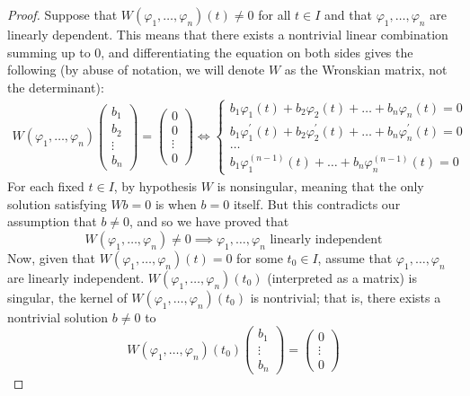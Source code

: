 \documentclass{article}
\theoremstyle{remark}
\theoremstyle{definition}
\begin{document}
\begin{proof}
Suppose that $W(\varphi_1, \ldots, \varphi_n) (t) \neq 0$ for all $t \in I$ and that $\varphi_1, \ldots, \varphi_n$ are linearly dependent. This means that there exists a nontrivial linear combination summing up to $0$, and differentiating the equation on both sides gives the following (by abuse of notation, we will denote $W$ as the Wronskian matrix, not the determinant): 
\begin{align*}
    W(\varphi_1, \ldots, \varphi_n) \begin{pmatrix}
    b_1 \\ b_2 \\ \vdots \\ b_n \end{pmatrix} = \begin{pmatrix}
    0 \\ 0 \\ \vdots \\ 0 \end{pmatrix} \iff
    \begin{cases}
    b_1 \varphi_1 (t) + b_2 \varphi_2 (t) + \ldots + b_n \varphi_n (t) = 0 \\
    b_1 \varphi^\prime_1 (t) + b_2 \varphi^\prime_2 (t) + \ldots + b_n \varphi^\prime_n (t) = 0 \\
    \ldots \\
    b_1 \varphi^{(n-1)}_1 (t) + \ldots + b_n \varphi^{(n-1)}_n (t) = 0 
    \end{cases}
\end{align*}
For each fixed $t \in I$, by hypothesis $W$ is nonsingular, meaning that the only solution satisfying $W b = 0$ is when $b = 0$ itself. But this contradicts our assumption that $b \neq 0$, and so we have proved that
\[W(\varphi_1, \ldots, \varphi_n) \neq 0 \implies \varphi_1, \ldots, \varphi_n \text{ linearly independent}\]
Now, given that $W(\varphi_1, \ldots, \varphi_n) (t) = 0$ for some $t_0 \in I$, assume that $\varphi_1, \ldots, \varphi_n$ are linearly independent. $W(\varphi_1, \ldots, \varphi_n)(t_0)$ (interpreted as a matrix) is singular, the kernel of $W(\varphi_1, \ldots, \varphi_n)(t_0)$ is nontrivial; that is, there exists a nontrivial solution $b \neq 0$ to 
\[W(\varphi_1, \ldots, \varphi_n)(t_0) \begin{pmatrix}
b_1 \\ \vdots \\ b_n \end{pmatrix}= \begin{pmatrix} 
0 \\ \vdots \\ 0 \end{pmatrix}\]

\end{proof}
\end{document}

